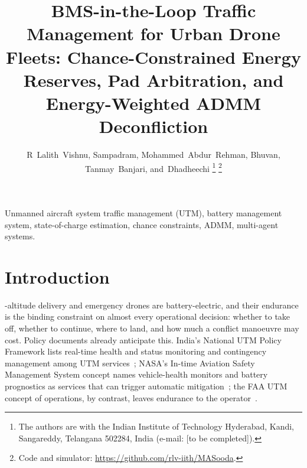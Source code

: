 \documentclass[journal]{IEEEtran}
\begin{document}
\title{BMS-in-the-Loop Traffic Management for Urban Drone Fleets: Chance-Constrained Energy Reserves, Pad Arbitration, and Energy-Weighted ADMM Deconfliction}

\author{R~Lalith~Vishnu,
        Sampadram,
        Mohammed~Abdur~Rehman,
        Bhuvan,
        Tanmay~Banjari,
        and~Dhadheechi%
\thanks{The authors are with the Indian Institute of Technology Hyderabad, Kandi, Sangareddy, Telangana 502284, India (e-mail: [to be completed]).}%
\thanks{Code and simulator: \url{https://github.com/rlv-iith/MASooda}.}}


\maketitle

\begin{abstract}
\end{abstract}

\begin{IEEEkeywords}
Unmanned aircraft system traffic management (UTM), battery management system, state-of-charge estimation, chance constraints, ADMM, multi-agent systems.
\end{IEEEkeywords}

\section{Introduction}
-altitude delivery and emergency drones are battery-electric, and their endurance is the binding constraint on almost every operational decision: whether to take off, whether to continue, where to land, and how much a conflict manoeuvre may cost. Policy documents already anticipate this. India's National UTM Policy Framework lists real-time health and status monitoring and contingency management among UTM services~\cite{indiaUTM2021}; NASA's In-time Aviation Safety Management System concept names vehicle-health monitors and battery prognostics as services that can trigger automatic mitigation~\cite{ellis2021iasms}; the FAA UTM concept of operations, by contrast, leaves endurance to the operator~\cite{faa2020conops}.
\end{document}
